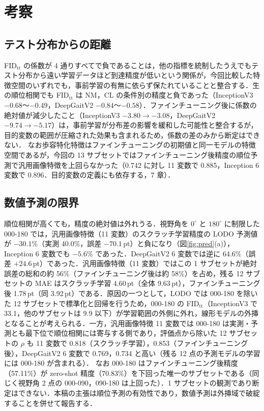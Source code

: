 \documentclass[technicalreport]{ieicej}
\begin{document}
\section{考察}
\subsection{テスト分布からの距離}
FID$_{\mathrm{tt}}$ の係数が 4 通りすべてで負であることは，他の指標を統制したうえでもテスト分布から遠い学習データほど到達精度が低いという関係が，今回比較した特徴空間のいずれでも，事前学習の有無に依らず保たれていることと整合する．生の順位相関でも FID$_{\mathrm{tt}}$ は NM，CL の条件別の精度と負であった（InceptionV3 $-0.68$〜$-0.49$，DeepGaitV2 $-0.84$〜$-0.58$）．ファインチューニング後に係数の絶対値が減少したこと（InceptionV3 $-3.80\to-3.08$，DeepGaitV2 $-9.74\to-5.17$）は，事前学習が分布差の影響を緩和した可能性と整合するが，目的変数の範囲が圧縮された効果も含まれるため，係数の差のみから断定はできない．
なお歩容特化特徴はファインチューニングの初期値と同一モデルの特徴空間であるが，今回の 13 サブセットではファインチューニング後精度の順位予測で汎用画像特徴を上回らなかった（0.742 に対し 11 変数で 0.885，Inception 6 変数で 0.896．目的変数の定義にも依存する，7 章）．

\subsection{数値予測の限界}
順位相関が高くても，精度の絶対値は外れうる．視野角を $0^\circ$ と $180^\circ$ に制限した 000-180 では，汎用画像特徴（11 変数）のスクラッチ学習精度の LODO 予測値が $-30.1\%$（実測 40.0\%，誤差 $-70.1$\,pt）と負になり（図\ref{fig:pred}(a)），Inception 6 変数でも $-5.6\%$ であった．DeepGaitV2 6 変数では逆に 64.6\%（誤差 $+24.6$\,pt）であった．汎用画像特徴（11 変数）ではこの 1 サブセットが絶対誤差の総和の約 56\%（ファインチューニング後は約 58\%）を占め，残る 12 サブセットの MAE はスクラッチ学習 4.60\,pt（全体 9.63\,pt），ファインチューニング後 1.78\,pt（同 3.92\,pt）である．原因の一つとして，LODO では 000-180 を除いた 12 サブセットで標準化と回帰を行うため，000-180 の FID$_{\mathrm{tt}}$（InceptionV3 で 33.1，他のサブセットは 9.9 以下）が学習範囲の外側に外れ，線形モデルの外挿となることが考えられる．一方，汎用画像特徴 11 変数では 000-180 は実測・予測とも最下位で順位相関には寄与する側であり，評価点から除いた 12 サブセットの $\rho$ も 11 変数で 0.818（スクラッチ学習），0.853（ファインチューニング後），DeepGaitV2 6 変数で 0.769，0.734 と高い（残る 12 点の予測モデルの学習には 000-180 が含まれる）．
なお 000-180 はファインチューニング後精度（57.11\%）が zero-shot 精度（70.83\%）を下回った唯一のサブセットである（同じく視野角 2 点の 000-090，090-180 は上回った）．1 サブセットの観測であり断定はできない．本稿の主張は順位予測の有効性であり，数値予測は外挿域で破綻することを併せて報告する．
\end{document}
